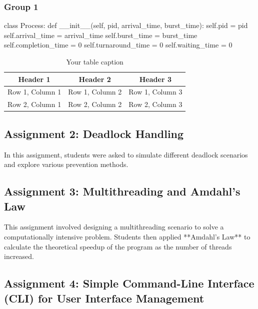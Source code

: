 \documentclass[12pt]{article}
\begin{document}
\subsubsection{Group 1}
\begin{python}
    class Process:
    def __init__(self, pid, arrival_time, burst_time):
        self.pid = pid
        self.arrival_time = arrival_time
        self.burst_time = burst_time
        self.completion_time = 0
        self.turnaround_time = 0
        self.waiting_time = 0
\end{python}

\begin{table}[htbp] %
    \centering
    \begin{tabular}{|c|c|c|} %
    \hline
    Header 1 & Header 2 & Header 3 \\ %
    \hline
    Row 1, Column 1 & Row 1, Column 2 & Row 1, Column 3 \\ %
    \hline
    Row 2, Column 1 & Row 2, Column 2 & Row 2, Column 3 \\ %
    \hline
    \end{tabular}
    \caption{Your table caption} %
    \label{tab:your_label} %
\end{table}
\subsection{Assignment 2: Deadlock Handling}
In this assignment, students were asked to simulate different deadlock scenarios and explore various prevention methods.

\subsection{Assignment 3: Multithreading and Amdahl's Law}
This assignment involved designing a multithreading scenario to solve a computationally intensive problem. Students then applied **Amdahl's Law** to calculate the theoretical speedup of the program as the number of threads increased.

\subsection{Assignment 4: Simple Command-Line Interface
(CLI) for User Interface Management}
\end{document}
